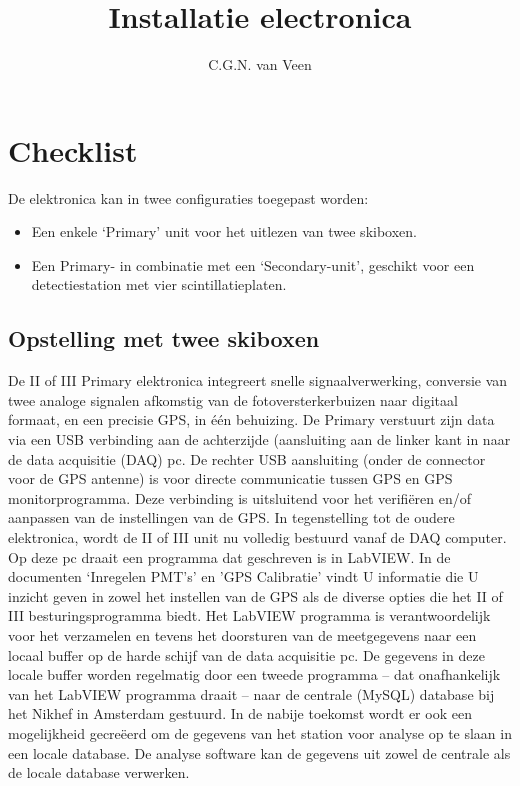 

\title{Installatie \hisparc electronica}
\author{C.G.N. van Veen}



\maketitle

\section{Checklist}

De \hisparc elektronica kan in twee configuraties toegepast worden:
\begin{itemize}
    \item Een enkele ‘Primary’ unit voor het uitlezen van twee skiboxen.
    \item Een Primary- in combinatie met een ‘Secondary-unit’, geschikt voor
    een detectiestation met vier scintillatieplaten.
\end{itemize}

\subsection{Opstelling met twee skiboxen}

De \hisparc II of III Primary elektronica 
integreert snelle signaalverwerking, conversie van twee analoge signalen afkomstig van de
fotoversterkerbuizen naar digitaal formaat, en een precisie GPS, in één
behuizing. De Primary verstuurt zijn data via een USB verbinding aan de
achterzijde (aansluiting aan de linker kant in 
naar de data acquisitie (DAQ) pc. De rechter USB aansluiting (onder de
connector voor de GPS antenne) is voor directe communicatie tussen GPS
en GPS monitorprogramma. Deze verbinding is uitsluitend voor het
verifiëren en/of aanpassen van de instellingen van de GPS. In
tegenstelling tot de oudere elektronica, wordt de \hisparc II of III unit
nu volledig bestuurd vanaf de DAQ computer. Op deze pc draait een
programma dat geschreven is in LabVIEW. In de documenten `Inregelen
PMT's' en 'GPS Calibratie'  vindt U informatie die U inzicht geven in
zowel het instellen van de GPS als de diverse opties die het \hisparc
II of III besturingsprogramma biedt. Het LabVIEW programma is
verantwoordelijk voor het verzamelen en tevens het doorsturen van de
meetgegevens naar een locaal buffer op de harde schijf van de data
acquisitie pc. De gegevens in deze locale buffer worden regelmatig door
een tweede programma – dat onafhankelijk van het LabVIEW programma
draait – naar de centrale (MySQL) database bij het Nikhef in Amsterdam
gestuurd. In de nabije toekomst wordt er ook een mogelijkheid gecreëerd
om de gegevens van het station voor analyse op te slaan in een locale
database. De analyse software kan de gegevens uit zowel de centrale als
de locale database verwerken.

